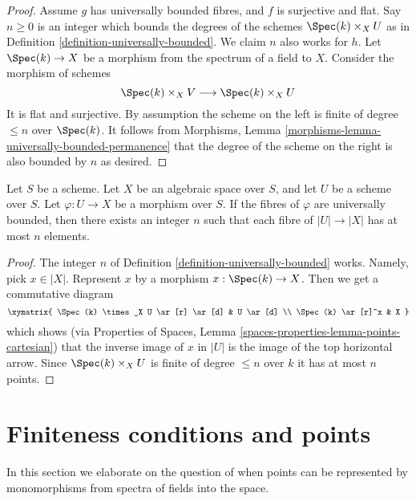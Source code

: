 \begin{proof}
Assume $g$ has universally bounded fibres, and $f$ is surjective and flat.
Say $n \geq 0$ is an integer which bounds the degrees of the schemes
$\Spec(k) \times_X U$ as in
Definition \ref{definition-universally-bounded}.
We claim $n$ also works for $h$.
Let $\Spec(k) \to X$ be a morphism from the spectrum of a
field to $X$. Consider the morphism of schemes
$$
\Spec(k) \times_X V \longrightarrow \Spec(k) \times_X U
$$
It is flat and surjective. By assumption the scheme
on the left is finite of degree $\leq n$ over $\Spec(k)$.
It follows from
Morphisms, Lemma \ref{morphisms-lemma-universally-bounded-permanence}
that the degree of the scheme on the right is also bounded by $n$
as desired.
\end{proof}

\begin{lemma}
\label{lemma-universally-bounded-finite-fibres}
Let $S$ be a scheme.
Let $X$ be an algebraic space over $S$, and let $U$ be a scheme over $S$.
Let $\varphi : U \to X$ be a morphism over $S$.
If the fibres of $\varphi$ are universally bounded, then there exists an
integer $n$ such that each fibre of $|U| \to |X|$ has at most
$n$ elements.
\end{lemma}

\begin{proof}
The integer $n$ of Definition \ref{definition-universally-bounded} works.
Namely, pick $x \in |X|$. Represent $x$ by a morphism
$x : \Spec(k) \to X$. Then we get a commutative diagram
$$
\xymatrix{
\Spec(k) \times_X U \ar[r] \ar[d] & U \ar[d] \\
\Spec(k) \ar[r]^x & X
}
$$
which shows (via
Properties of Spaces,
Lemma \ref{spaces-properties-lemma-points-cartesian})
that the inverse image of $x$ in $|U|$ is the image of
the top horizontal arrow. Since $\Spec(k) \times_X U$ is finite
of degree $\leq n$ over $k$ it has at most $n$ points.
\end{proof}








\section{Finiteness conditions and points}
\label{section-points-monomorphisms}

\noindent
In this section we elaborate on the question of when points can be represented
by monomorphisms from spectra of fields into the space.

